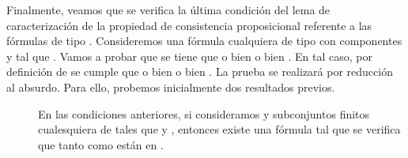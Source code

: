 \begin{isabellebody}
\begin{isamarkuptext}
\begin{demostracion}
  Finalmente, veamos que se verifica la última condición del lema de caracterización de la propiedad
  de consistencia proposicional referente a las fórmulas de tipo \isa{{\isasymbeta}}. Consideremos una fórmula 
  cualquiera  de tipo \isa{{\isasymbeta}} con componentes  y  tal que . Vamos a probar que se
  tiene que o bien  o bien . En tal caso, por definición de  se
  cumple que o bien  o bien . La prueba se realizará por reducción al
  absurdo. Para ello, probemos inicialmente dos resultados previos.

  \begin{description}
    \item[\isa{{\isasymone}{\isacharparenright}}] En las condiciones anteriores, si consideramos  y  subconjuntos finitos 
    cualesquiera de  tales que  y , entonces existe una fórmula  tal 
    que se verifica que tanto  como  están en .
  \end{description}
  

\end{demostracion}
\end{isamarkuptext}
\end{isabellebody}

